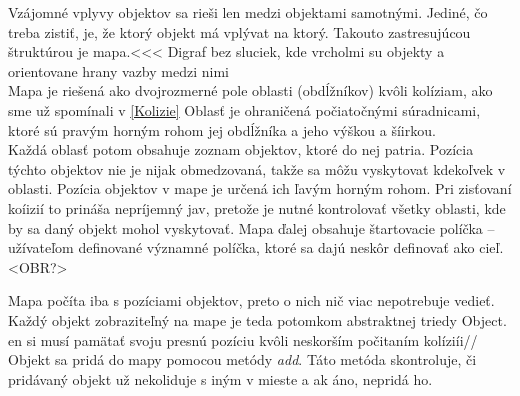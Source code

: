 Vzájomné vplyvy objektov sa rieši len medzi objektami samotnými. Jediné, čo treba zistiť, je, že ktorý objekt má vplývat na ktorý. Takouto zastresujúcou štruktúrou  je mapa.<<< Digraf bez sluciek, kde vrcholmi su objekty a orientovane hrany vazby medzi nimi\\
Mapa je riešená ako dvojrozmerné pole oblasti (obdĺžníkov) kvôli kolíziam, ako sme už spomínali v \ref{Kolizie} Oblasť je ohraničená počiatočnými súradnicami, ktoré sú pravým horným rohom jej obdĺžníka a jeho výškou a šíirkou.\\
Každá oblasť potom obsahuje zoznam objektov, ktoré do nej patria. Pozícia týchto objektov nie je nijak obmedzovaná, takže sa môžu vyskytovat kdekoľvek v oblasti. Pozícia objektov v mape je určená ich ľavým horným rohom. Pri zisťovaní koíizií to prináša  nepríjemný jav, pretože je nutné kontrolovať všetky oblasti, kde by sa daný objekt mohol vyskytovať. Mapa ďalej obsahuje štartovacie políčka -- užívateľom definované významné políčka, ktoré sa dajú neskôr definovať ako cieľ. \\ <OBR?>

Mapa počíta iba s pozíciami objektov, preto o nich nič viac nepotrebuje vedieť. Každý objekt zobraziteľný na mape je teda potomkom abstraktnej triedy Object. en si musí pamätať svoju presnú pozíciu kvôli neskorším počitaním kolíziíi//
Objekt sa pridá do mapy pomocou metódy {\it add}. Táto metóda skontroluje, či pridávaný objekt už nekoliduje s iným v mieste a ak áno, nepridá ho. \\ %

